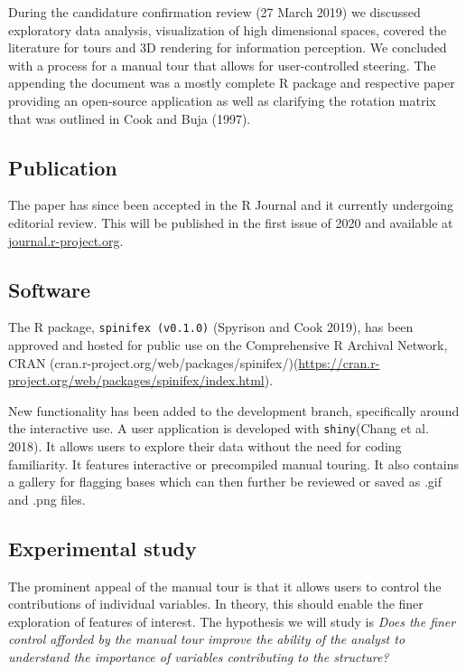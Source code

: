 \documentclass[
  11,
]{article}
\begin{document}
During the candidature confirmation review (27 March 2019) we discussed exploratory data analysis, visualization of high dimensional spaces, covered the literature for tours and 3D rendering for information perception. We concluded with a process for a manual tour that allows for user-controlled steering. The appending the document was a mostly complete R package and respective paper providing an open-source application as well as clarifying the rotation matrix that was outlined in Cook and Buja (1997).

\hypertarget{publication}{%
\subsection{Publication}\label{publication}}

The paper has since been accepted in the R Journal and it currently undergoing editorial review. This will be published in the first issue of 2020 and available at \href{https://journal.r-project.org/}{journal.r-project.org}.

\hypertarget{software}{%
\subsection{Software}\label{software}}

The R package, \texttt{spinifex\ (v0.1.0)} (Spyrison and Cook 2019), has been approved and hosted for public use on the Comprehensive R Archival Network, CRAN (cran.r-project.org/web/packages/spinifex/)(\url{https://cran.r-project.org/web/packages/spinifex/index.html}).

New functionality has been added to the development branch, specifically around the interactive use. A user application is developed with \texttt{shiny}(Chang et al. 2018). It allows users to explore their data without the need for coding familiarity. It features interactive or precompiled manual touring. It also contains a gallery for flagging bases which can then further be reviewed or saved as .gif and .png files.

\hypertarget{sec:expStudy}{%
\subsection{Experimental study}\label{sec:expStudy}}

The prominent appeal of the manual tour is that it allows users to control the contributions of individual variables. In theory, this should enable the finer exploration of features of interest. The hypothesis we will study is \emph{Does the finer control afforded by the manual tour improve the ability of the analyst to understand the importance of variables contributing to the structure?}
\end{document}
